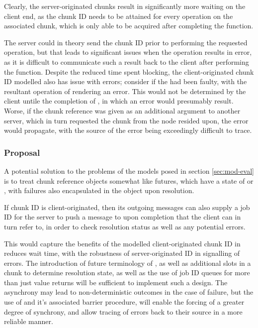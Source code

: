 Clearly, the server-originated chunks result in significantly more waiting on
the client end, as the chunk ID needs to be attained for every operation on the
associated chunk, which is only able to be acquired after completing the
function.

The server could in theory send the chunk ID prior to performing the requested
operation, but that leads to significant issues when the operation results in
error, as it is difficult to communicate such a result back to the client after
performing the function.
Despite the reduced time spent blocking, the client-originated chunk ID
modelled also has issue with errors; consider if the  had
been faulty, with the resultant operation of  rendering an error.
This would not be determined by the client untile the completion of
, in which an error would presumably result.
Worse, if the chunk reference  was given as an additional argument to
another server, which in turn requested the chunk  from the node
 resided upon, the error would propagate, with the source of the
error being exceedingly difficult to trace.

\subsubsection{Proposal}

A potential solution to the problems of the models posed in section
\cref{sec:mod-eval} is to treat chunk reference objects somewhat like futures,
which have a state of  or , with failures
also encapsulated in the object upon resolution\cite{bengtsson19:future-r}.

If chunk ID is client-originated, then its outgoing messages can also supply a
job ID for the server to push a message to upon completion that the client can
in turn refer to, in order to check resolution status as well as any potential
errors.

This would capture the benefits of the modelled client-originated chunk ID in
reduces wait time, with the robustness of server-originated ID in signalling of
errors.
The introduction of future terminology of , as well as
additional slots in a chunk to determine resolution state, as well as the use
of job ID queues for more than just value returns will be sufficient to
implement such a design.
The asynchrony may lead to non-deterministic outcomes in the case of failure,
but the use of  and it's associated barrier procedure,
 will enable the forcing of a greater degree of synchrony,
and allow tracing of errors back to their source in a more reliable manner.

